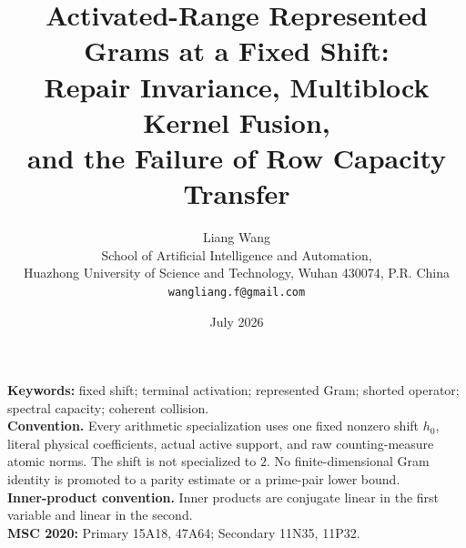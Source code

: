 \documentclass[11pt]{article}
\title{Activated-Range Represented Grams at a Fixed Shift:\\
Repair Invariance, Multiblock Kernel Fusion,\\
and the Failure of Row Capacity Transfer}
\author{Liang Wang\\
School of Artificial Intelligence and Automation,\\
Huazhong University of Science and Technology, Wuhan 430074, P.R. China\\
\texttt{wangliang.f@gmail.com}}
\date{July 2026}
\theoremstyle{remark}
\begin{document}
\maketitle


\noindent\textbf{Keywords:} fixed shift; terminal activation; represented Gram;
shorted operator; spectral capacity; coherent collision.\\[0.5em]
\noindent\textbf{Convention.} Every arithmetic specialization uses one fixed
nonzero shift \(h_0\), literal physical coefficients, actual active support,
and raw counting-measure atomic norms.  The shift is not specialized to \(2\).
No finite-dimensional Gram identity is promoted to a parity estimate or a
prime-pair lower bound.\\[0.5em]
\noindent\textbf{Inner-product convention.} Inner products are conjugate
linear in the first variable and linear in the second.\\[0.5em]
\noindent\textbf{MSC 2020:} Primary 15A18, 47A64; Secondary 11N35, 11P32.











\begingroup
\small
\raggedright


\endgroup
\end{document}
